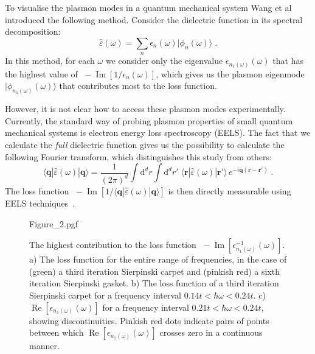 To visualise the plasmon modes in a quantum mechanical system Wang et al~\cite{wang_plasmonic_2015} introduced the following method. Consider the dielectric function in its spectral decomposition:
\begin{equation}
    \hat\varepsilon(\omega) = \sum_n \epsilon_n(\omega)|\phi_n(\omega)\rangle
        \;.
\end{equation}
In this method, for each $\omega$ we consider only the eigenvalue $\epsilon_{n_1(\omega)}(\omega)$ that has the highest value of $\;-\operatorname{Im}[1/\epsilon_n(\omega)]$, which gives us the plasmon eigenmode $|\phi_{n_1(\omega)}(\omega)\rangle$ that contributes most to the loss function.

However, it is not clear how to access these plasmon modes experimentally. Currently, the standard way of probing plasmon properties of small quantum mechanical systems is electron energy loss spectroscopy (EELS).  The fact that we calculate the \emph{full} dielectric function gives us the possibility to calculate the following Fourier transform, which distinguishes this study from others:
\begin{equation}
    \langle\mathbf{q} |\hat\varepsilon(\omega)| \mathbf{q}\rangle
        = \frac{1}{(2\pi)^d} \int\!\!\text{d}^d r \!\!\!\int\!\!\text{d}^d r'\;
            \langle\mathbf{r} |\hat\varepsilon(\omega)| \mathbf{r'}\rangle\,
                e^{-i\mathbf{q}(\mathbf{r} - \mathbf{r'})} \; .
\end{equation}
The loss function $\; -\operatorname{Im}[1 / \langle\mathbf{q}|\hat\varepsilon(\omega)| \mathbf{q}\rangle]$ is then directly measurable using EELS techniques~\cite{nozieres1999theory,platzman1973waves,Vonsov2012QuantumSolidS,giuliani2005quantum,lu2009plasmon}.

\begin{figure}[h]
    \centering
    {Figure_2.pgf}
    \caption{The highest contribution to the loss function $\;-\operatorname{Im}[\epsilon^{-1}_{n_1(\omega)} (\omega)]$. a) The loss function for the entire range of frequencies, in the case of (green) a third iteration Sierpinski carpet and (pinkish red) a sixth iteration Sierpinski gasket. b) The loss function of a third iteration Sierpinski carpet for a frequency interval $0.14t < \hbar\omega < 0.24t$. c) $\operatorname{Re}[\epsilon_{n_1(\omega)} (\omega)]$ for a frequency interval $0.21t < \hbar\omega < 0.24t$, showing discontinuities. Pinkish red dots indicate pairs of points between which $\operatorname{Re}[\epsilon_{n_1(\omega)}(\omega)]$ crosses zero in a continuous manner.}
    \label{fig:prb18:spectrum}
\end{figure}

